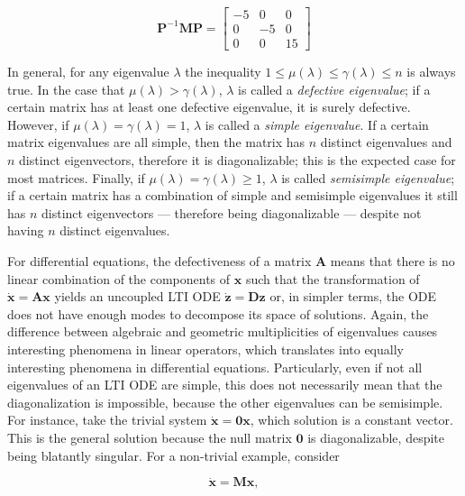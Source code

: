 \begin{equation} \mathbf{P}^{-1}\mathbf{MP} = \left[\begin{array}{ccc} -5 & 0 & 0 \\[3mm] 0 & -5 & 0 \\[3mm] 0 & 0 & 15\end{array}\right] \end{equation}

	In general, for any eigenvalue $\lambda$ the inequality $1 \leq \mu\left(\lambda\right) \leq \gamma\left(\lambda\right) \leq n$ is always true. In the case that $\mu\left(\lambda\right) > \gamma\left(\lambda\right)$, $\lambda$ is called a \textit{defective eigenvalue}; if a certain matrix has at least one defective eigenvalue, it is surely defective. However, if $\mu\left(\lambda\right) = \gamma\left(\lambda\right) = 1$, $\lambda$ is called a \textit{simple eigenvalue}. If a certain matrix eigenvalues are all simple, then the matrix has $n$ distinct eigenvalues and $n$ distinct eigenvectors, therefore it is diagonalizable; this is the expected case for most matrices. Finally, if $\mu\left(\lambda\right) = \gamma\left(\lambda\right) \geq 1$, $\lambda$ is called \textit{semisimple eigenvalue}; if a certain matrix has a combination of simple and semisimple eigenvalues it still has $n$ distinct eigenvectors — therefore being diagonalizable — despite not having $n$ distinct eigenvalues.

	For differential equations, the defectiveness of a matrix $\mathbf{A}$ means that there is no linear combination of the components of $\mathbf{x}$ such that the transformation of $\dot{\mathbf{x}} = \mathbf{Ax}$ yields an uncoupled LTI ODE $\dot{\mathbf{z}} = \mathbf{Dz}$ or, in simpler terms, the ODE does not have enough modes to decompose its space of solutions. Again, the difference between algebraic and geometric multiplicities of eigenvalues causes interesting phenomena in linear operators, which translates into equally interesting phenomena in differential equations. Particularly, even if not all eigenvalues of an LTI ODE are simple, this does not necessarily mean that the diagonalization is impossible, because the other eigenvalues can be semisimple. For instance, take the trivial system $\dot{\mathbf{x}} = \mathbf{0x}$, which solution is a constant vector. This is the general solution because the null matrix $\mathbf{0}$ is diagonalizable, despite being blatantly singular. For a non-trivial example, consider

\begin{equation} \dot{\mathbf{x}} = \mathbf{Mx}, \end{equation}

